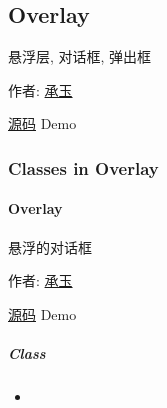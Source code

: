 \documentclass[letterpaper,10pt,english]{sphinxmanual}
\begin{document}
\subsection{Overlay}
\label{api/component/overlay/index::doc}\label{api/component/overlay/index:overlay}
\begin{DUlineblock}{0em}
\item[] 悬浮层, 对话框, 弹出框
\item[] 作者: \href{mailto:yiminghe@gmail.com}{承玉}
\item[] \href{https://github.com/kissyteam/kissy/tree/master/src/overlay/}{源码}  \textbar{} Demo
\end{DUlineblock}


\subsubsection{Classes in Overlay}
\label{api/component/overlay/index:classes-in-overlay}\label{api/component/overlay/overlay:module-Overlay}

\paragraph{Overlay}
\label{api/component/overlay/overlay::doc}\label{api/component/overlay/overlay:overlay}
\begin{DUlineblock}{0em}
\item[] 悬浮的对话框
\item[] 作者: \href{mailto:yiminghe@gmail.com}{承玉}
\item[] \href{https://github.com/kissyteam/kissy/tree/master/src/overlay/}{源码}  \textbar{} Demo
\end{DUlineblock}


\subparagraph{Class}
\label{api/component/overlay/overlay:class}\begin{itemize}
\item {}
{\hyperref[api/component/overlay/overlay:Overlay.Overlay]{}}

\end{itemize}
\end{document}
